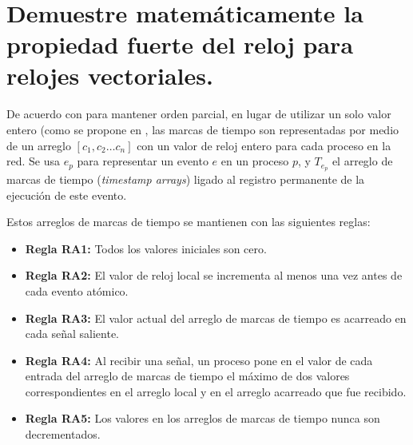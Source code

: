 \documentclass[12pt, times]{simauth}
\begin{document}

\title{
    { \fontsize{30}{1} \selectfont{
        Tarea 2: Tiempo Lógico }
    }
}

\author{
    { \fontsize{14}{1} \selectfont{
        Carlos Martín Flores González \\
        Carné: 2015183528\\ 
        17 de Abril del 2017
        }
    }
}

%



\maketitle

\tableofcontents

\section{Demuestre matemáticamente la propiedad fuerte del reloj para relojes vectoriales.}

De acuerdo con \cite{fidge} para mantener orden parcial, en lugar de utilizar un solo valor entero (como se propone en \cite{lamport}, las marcas de tiempo son representadas por medio de un arreglo $[c_1, c_2 \dots c_n]$ con un valor de reloj entero para cada proceso en la red. Se usa $e_p$ para representar un evento $e$ en un proceso $p$, y $T_{e_p}$ el arreglo de marcas de tiempo (\emph{timestamp arrays}) ligado al registro permanente de la ejecución de este evento. 

Estos arreglos de marcas de tiempo se mantienen con las siguientes reglas:
\begin{itemize}
    \item[] \textbf{Regla RA1:} Todos los valores iniciales son cero.
    \item[] \textbf{Regla RA2:} El valor de reloj local se incrementa al menos una vez antes de cada evento atómico.
    \item[] \textbf{Regla RA3:} El valor actual del arreglo de marcas de tiempo es acarreado en cada señal saliente.
    \item[] \textbf{Regla RA4:} Al recibir una señal, un proceso pone en el valor de cada entrada del arreglo de marcas de tiempo el máximo de dos valores correspondientes en el arreglo local y en el arreglo acarreado que fue recibido.
    \item[] \textbf{Regla RA5:} Los valores en los arreglos de marcas de tiempo nunca son decrementados.
\end{itemize}
\end{document}
